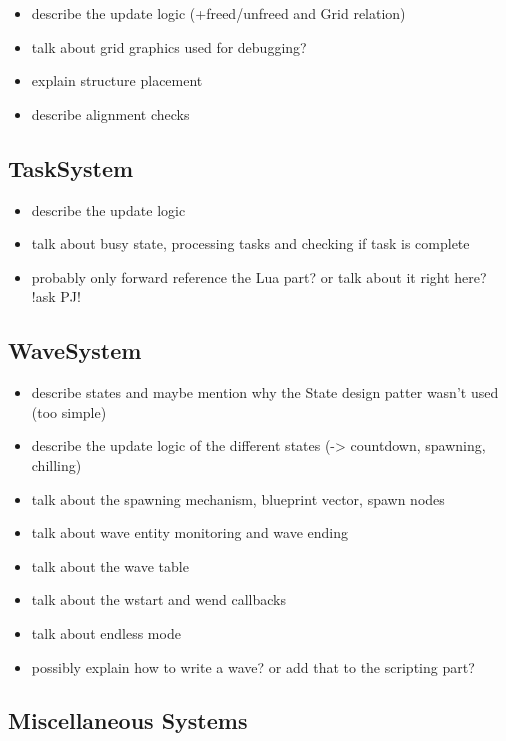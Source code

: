 \begin{itemize}
    \item describe the update logic (+freed/unfreed and Grid relation)
    \item talk about grid graphics used for debugging?
    \item explain structure placement
    \item describe alignment checks
\end{itemize}

\subsection{TaskSystem}

\begin{itemize}
    \item describe the update logic
    \item talk about busy state, processing tasks and checking if task is complete
    \item probably only forward reference the Lua part? or talk about it right here? !ask PJ!
\end{itemize}

\subsection{WaveSystem}

\begin{itemize}
    \item describe states and maybe mention why the State design patter wasn't used (too simple)
    \item describe the update logic of the different states (-> countdown, spawning, chilling)
    \item talk about the spawning mechanism, blueprint vector, spawn nodes
    \item talk about wave entity monitoring and wave ending
    \item talk about the wave table
    \item talk about the wstart and wend callbacks
    \item talk about endless mode
    \item possibly explain how to write a wave? or add that to the scripting part?
\end{itemize}

\subsection{Miscellaneous Systems}

